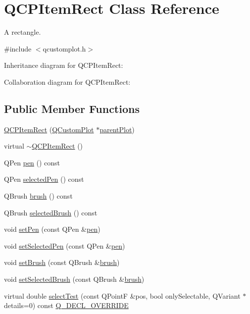 \hypertarget{class_q_c_p_item_rect}{}\section{Q\+C\+P\+Item\+Rect Class Reference}
\label{class_q_c_p_item_rect}


A rectangle.  




{\ttfamily \#include $<$qcustomplot.\+h$>$}



Inheritance diagram for Q\+C\+P\+Item\+Rect\+:


Collaboration diagram for Q\+C\+P\+Item\+Rect\+:
\subsection*{Public Member Functions}
\begin{DoxyCompactItemize}
\item 
\hyperlink{class_q_c_p_item_rect_a412ad1579f7a1fba453d0fa28c496cbc}{Q\+C\+P\+Item\+Rect} (\hyperlink{class_q_custom_plot}{Q\+Custom\+Plot} $\ast$\hyperlink{class_q_c_p_layerable_a473edb813a4c1929d6b6a8fe3ff3faf7}{parent\+Plot})
\item 
virtual \hyperlink{class_q_c_p_item_rect_af9e89f80457afc2d0fd2c6527b40a5f2}{$\sim$\+Q\+C\+P\+Item\+Rect} ()
\item 
Q\+Pen \hyperlink{class_q_c_p_item_rect_a3ee2f580a3950dc11247f405ce8b6ecf}{pen} () const
\item 
Q\+Pen \hyperlink{class_q_c_p_item_rect_abd93cf93404ce827dfae71d9d9d08b29}{selected\+Pen} () const
\item 
Q\+Brush \hyperlink{class_q_c_p_item_rect_a5071d7fd864428a1398152aca87b54ad}{brush} () const
\item 
Q\+Brush \hyperlink{class_q_c_p_item_rect_a2b0a6852bc92d716c7e811c90de2c1a9}{selected\+Brush} () const
\item 
void \hyperlink{class_q_c_p_item_rect_a483c0da5a17e1646cd17ddea2c124e7d}{set\+Pen} (const Q\+Pen \&\hyperlink{class_q_c_p_item_rect_a3ee2f580a3950dc11247f405ce8b6ecf}{pen})
\item 
void \hyperlink{class_q_c_p_item_rect_a52a1bcb2dc753a538e406a2ba3cf21ce}{set\+Selected\+Pen} (const Q\+Pen \&\hyperlink{class_q_c_p_item_rect_a3ee2f580a3950dc11247f405ce8b6ecf}{pen})
\item 
void \hyperlink{class_q_c_p_item_rect_abbd4e346a03513ee466afc25d9c75446}{set\+Brush} (const Q\+Brush \&\hyperlink{class_q_c_p_item_rect_a5071d7fd864428a1398152aca87b54ad}{brush})
\item 
void \hyperlink{class_q_c_p_item_rect_abd1792859844118dedee86223cede7af}{set\+Selected\+Brush} (const Q\+Brush \&\hyperlink{class_q_c_p_item_rect_a5071d7fd864428a1398152aca87b54ad}{brush})
\item 
virtual double \hyperlink{class_q_c_p_item_rect_a2e68621b75bae4da6ae0ab2cdd0dd733}{select\+Test} (const Q\+PointF \&pos, bool only\+Selectable, Q\+Variant $\ast$details=0) const \hyperlink{qcustomplot_8h_a42cc5eaeb25b85f8b52d2a4b94c56f55}{Q\+\_\+\+D\+E\+C\+L\+\_\+\+O\+V\+E\+R\+R\+I\+DE}
\end{DoxyCompactItemize}
